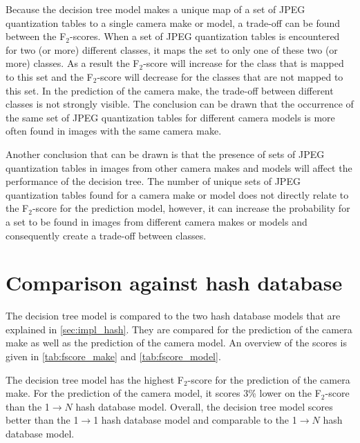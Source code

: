 Because the decision tree model makes a unique map of a set of JPEG quantization tables to a single camera make or model, a trade-off can be found between the F$_2$-scores. When a set of JPEG quantization tables is encountered for two (or more) different classes, it maps the set to only one of these two (or more) classes. As a result the F$_2$-score will increase for the class that is mapped to this set and the F$_2$-score will decrease for the classes that are not mapped to this set. In the prediction of the camera make, the trade-off between different classes is not strongly visible. The conclusion can be drawn that the occurrence of the same set of JPEG quantization tables for different camera models is more often found in images with the same camera make.

Another conclusion that can be drawn is that the presence of sets of JPEG quantization tables in images from other camera makes and models will affect the performance of the decision tree. The number of unique sets of JPEG quantization tables found for a camera make or model does not directly relate to the F$_2$-score for the prediction model, however, it can increase the probability for a set to be found in images from different camera makes or models and consequently create a trade-off between classes.





\section{Comparison against hash database}
The decision tree model is compared to the two hash database models that are explained in \autoref{sec:impl_hash}. They are compared for the prediction of the camera make as well as the prediction of the camera model. An overview of the scores is given in \autoref{tab:fscore_make} and \autoref{tab:fscore_model}.

The decision tree model has the highest F$_2$-score for the prediction of the camera make. For the prediction of the camera model, it scores 3\% lower on the F$_2$-score than the 1$\rightarrow N$ hash database model. Overall, the decision tree model scores better than the 1$\rightarrow$1 hash database model and comparable to the 1$\rightarrow N$ hash database model.

